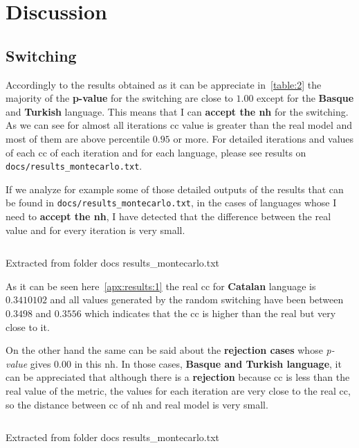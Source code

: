 \documentclass[12pt, a4paper]{article}
\begin{document}
\section{Discussion}
\subsection{Switching}
Accordingly to the results obtained as it can be appreciate in~\ref{table:2} the majority of the \textbf{p-value} for the 
\acrshort{switching} are close to $1.00$ except for the \textbf{Basque} and \textbf{Turkish} language. This means that I can \textbf{accept the \acrfull{nh}}  
for the \acrshort{switching}. As we can see for almost all iterations \acrshort{cc} value is greater than the real model and most of them are above percentile $0.95$ or more.
For detailed iterations and values of each \acrshort{cc} of each iteration and for each language, please see results on \texttt{docs/results_montecarlo.txt}.

If we analyze for example some of those detailed outputs of the results that can be found in \texttt{docs/results_montecarlo.txt},
in the cases of languages whose I need to \textbf{accept the \acrshort{nh}}, I have detected that the difference between the real value and for every
iteration is very small. 

\begin{listing}[H]
    \inputminted[firstline=58, lastline=78, breaklines]{bash}{./results_montecarlo.txt}
    \caption{Extracted from folder docs results\_montecarlo.txt}
    \label{apx:results:1}
\end{listing}  

As it can be seen here~\ref{apx:results:1} the real \acrshort{cc} for \textbf{Catalan} language is \textbf{$0.3410102$}
and all values generated by the random \acrshort{switching} have been between $0.3498$ and $0.3556$ which indicates that
the \acrshort{cc} is higher than the real but very close to it.

On the other hand the same can be said about the \textbf{rejection cases} whose \textit{p-value} gives $0.00$ in this \acrshort{nh}.
In those cases, \textbf{Basque and Turkish language}, it can be appreciated that although there is a \textbf{rejection} because \acrshort{cc} 
is less than the real value of the metric, the values for each iteration are very close to the real \acrshort{cc}, so the distance between \acrshort{cc} of 
\acrshort{nh} and real model is very small.

\begin{listing}[H]
    \inputminted[firstline=12, lastline=32, breaklines]{bash}{./results_montecarlo.txt}
    \caption{Extracted from folder docs results\_montecarlo.txt}
    \label{apx:results:2}
\end{listing}  
\end{document}
